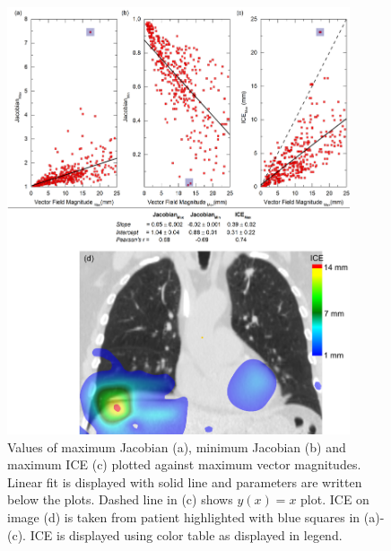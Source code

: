 
\newpage

\begin{figure}[H]
	\begin{center}		
		\includegraphics[width=0.9\textwidth]{./VisualMotionManagment/Images/maxVf_lung.png}
		\caption{Values of maximum Jacobian (a), minimum Jacobian (b) and maximum ICE (c) plotted against maximum vector magnitudes. Linear fit is displayed with solid line and parameters are written below the plots. Dashed line in (c) shows $y(x)= x$ plot. ICE on image (d) is taken from patient highlighted with blue squares in (a)-(c).
			ICE is displayed using color table as displayed in legend.}
		\label{maxvf}
	\end{center}
\end{figure}

